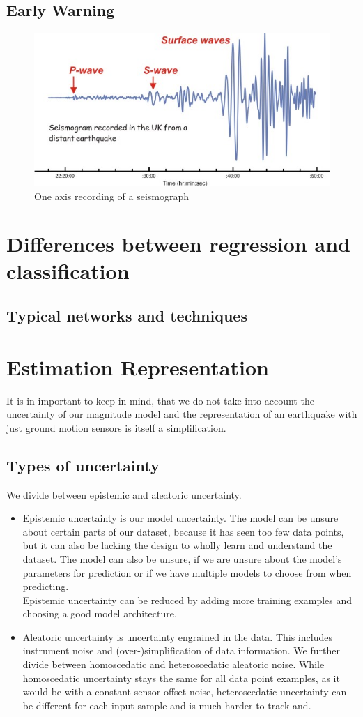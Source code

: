 \documentclass[thesis.tex]{subfiles}
\begin{document}
\subsection{Early Warning}
\begin{figure}[h!]
	\centering
	\includegraphics[width=0.6\linewidth]{../pictures/Prerequisites/dia_seismogram.jpg}
	\caption{One axis recording of a seismograph}
	\label{fig:seismogram}
\end{figure}
\section{Differences between regression and classification}
\subsection{Typical networks and techniques}
\section{Estimation Representation} 
 It is in important to keep in mind, that we do not take into account the uncertainty of our magnitude model and the representation of an earthquake with just ground motion sensors is itself a simplification.
\subsection{Types of uncertainty}
We divide between epistemic and aleatoric uncertainty.
\begin{itemize}
	\item Epistemic uncertainty is our model uncertainty. The model can be unsure about certain parts of our dataset, because it has seen too few data points, but it can also be lacking the design to wholly learn and understand the dataset. The model can also be unsure, if we are unsure about the model's parameters for prediction or if we have multiple models to choose from when predicting. 
	\\
	Epistemic uncertainty can be reduced by adding more training examples and choosing a good model architecture.
	\item Aleatoric uncertainty is uncertainty engrained in the data. This includes instrument noise and (over-)simplification of data information. We further divide between homoscedatic and heteroscedatic aleatoric noise. While homoscedatic uncertainty stays the same for all data point examples, as it would be with a constant sensor-offset noise, heteroscedatic uncertainty can be different for each input sample and is much harder to track and.
\end{itemize}
\end{document}
